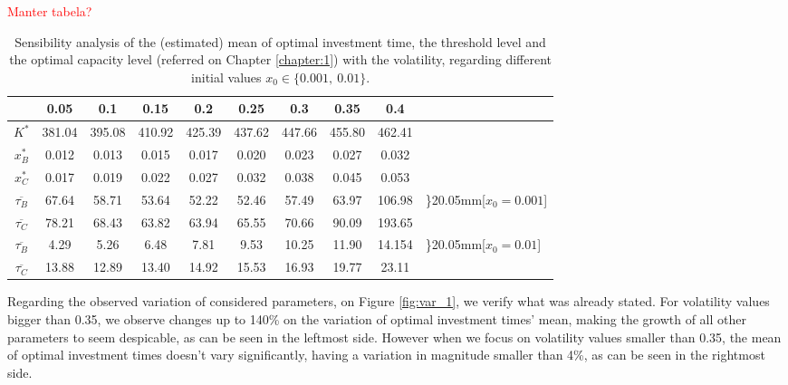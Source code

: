 \textcolor{red}{Manter tabela?}

\begin{table}[!ht]
	\centering
	\caption{Sensibility analysis of the (estimated) mean of optimal investment time, the threshold level and the optimal capacity level (referred on Chapter \ref{chapter:1}) with the volatility, regarding different initial values $x_0 \in \{0.001, \ 0.01\}$.}
	\begin{tabular}{c|ccccccccl}
		\hline
		\text{ $\sigma $ } & 0.05 & 0.1 & 0.15 & 0.2 & 0.25 & 0.3 & 0.35 & 0.4 \\ \hline
		$K^*$ & 381.04 & 395.08 & 410.92 & 425.39 & 437.62 & 447.66 & 455.80 & 462.41 \\
		$x_B^*$ & 0.012 & 0.013 & 0.015 & 0.017 & 0.020 & 0.023 & 0.027 & 0.032 \\
		$x_C^*$ & 0.017 & 0.019 & 0.022 & 0.027 & 0.032 & 0.038 & 0.045 & 0.053 \\ \hline
	   $\overline{\tau _B}$ & 67.64 & 58.71 & 53.64 & 52.22 & 52.46 & 57.49 & 63.97 & 106.98 & \rdelim\}{2}{0.05mm}[$x_0=0.001$]  \\
		$\overline{\tau _C}$ & 78.21 & 68.43 & 63.82 & 63.94 & 65.55 & 70.66 & 90.09 & 193.65 \\ \hline
		$\overline{\tau _B}$ & 4.29 & 5.26 & 6.48 & 7.81 & 9.53 & 10.25 & 11.90 & 14.154 &	\rdelim\}{2}{0.05mm}[$x_0=0.01$] \\
		$\overline{\tau _C}$ & 13.88 & 12.89 & 13.40 & 14.92 & 15.53 & 16.93 & 19.77 & 23.11
	 \\ \hline
	\end{tabular}
\label{tab:vol_1}
\end{table}


Regarding the observed variation of considered parameters, on Figure \ref{fig:var_1}, we verify what was already stated. 
For volatility values bigger than 0.35, we observe changes up to 140\% on the variation of optimal investment times' mean, making the growth of all other parameters to seem despicable, as can be seen in the leftmost side. 
However when we focus on volatility values smaller than 0.35, the mean of optimal investment times doesn't vary significantly, having a variation in magnitude smaller than 4\%, as can be seen in the rightmost side.



